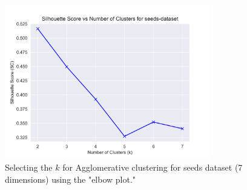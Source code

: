 \begin{figure}[H]
  \includegraphics[width=0.8\textwidth]{Appendix/parameter-selection/seeds-dataset_agglomerative_optimal_cluster_7.png}
  \caption{Selecting the $k$ for Agglomerative clustering for seeds dataset (7 dimensions) using the "elbow plot."}
  \label{hyperparameters:agglomerative-seeds-dataset-7d}
\end{figure}
\newpage

